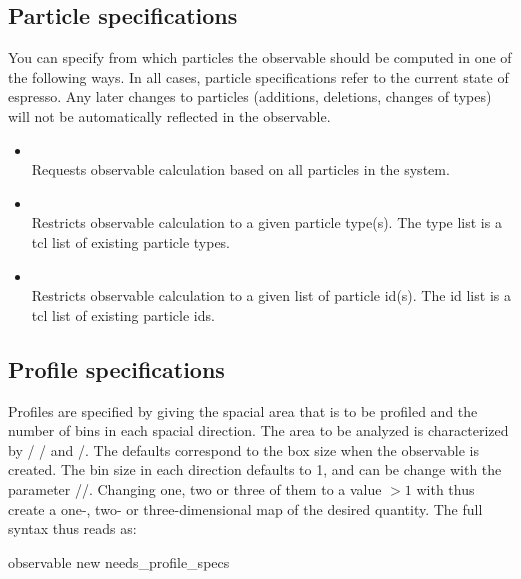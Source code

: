 \subsection{Particle specifications}
\label{sec:PartSpec}
You can specify from which particles the observable should be computed in one of 
the following ways. In all cases, particle specifications refer to the current
state of espresso. Any later changes to particles (additions, deletions, changes
of types) will not be automatically reflected in the observable.
  \begin{itemize}
    \item {} \\
          Requests observable calculation based on all particles in the system.
    \item {}  \\
          Restricts observable calculation to a given particle type(s). The type
	  list is a tcl list of existing particle types.
    \item {}  \\
          Restricts observable calculation to a given list of particle id(s). The id 
	  list is a tcl list of existing particle ids.
  \end{itemize}

\subsection{Profile specifications}
\label{sec:DensProfSpec}
Profiles are specified by giving the spacial area that is to be profiled and
the number of bins in each spacial direction. The area to be analyzed is characterized
by / / and /. The defaults
correspond to the box size when the observable is created.
The bin size in each direction defaults to 1, and can be change with the parameter 
//. Changing one, two or three of them to 
a value $>1$ with thus create a one-, two- or three-dimensional map of the desired quantity.
The full syntax thus reads as:
\begin{essyntax}
    observable new needs\_profile\_specs  
\end{essyntax}

